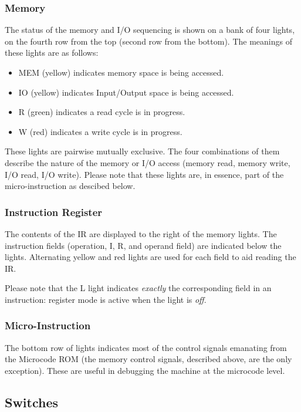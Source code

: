 \documentclass[11pt,a4paper,twocolumns]{article}
\newcommand{\lt}[1]{\textsf{#1}}
\newcommand\register[1]{\textsf{#1}}
\newcommand\IR{\register{IR}}
\begin{document}
\subsubsection{Memory}

The status of the memory and I/O sequencing is shown on a bank of four lights,
on the fourth row from the top (second row from the bottom). The meanings of
these lights are as follows:

\begin{itemize}
\item \lt{MEM} (yellow) indicates memory space is being accessed.
\item \lt{IO} (yellow) indicates Input/Output space is being accessed.
\item \lt{R} (green) indicates a read cycle is in progress.
\item \lt{W} (red) indicates a write cycle is in progress.
\end{itemize}

These lights are pairwise mutually exclusive. The four combinations of them
describe the nature of the memory or I/O access (memory read, memory write, I/O
read, I/O write). Please note that these lights are, in essence, part of the
micro-instruction as descibed below.

\subsubsection{Instruction Register}

The contents of the \IR{} are displayed to the right of the memory lights. The
instruction fields (operation, I, R, and operand field) are indicated below the
lights. Alternating yellow and red lights are used for each field to aid
reading the IR.

Please note that the \lt{L} light indicates {\em exactly\/} the corresponding
field in an instruction: register mode is active when the light is {\em off}.

\subsubsection{Micro-Instruction}

The bottom row of lights indicates most of the control signals emanating from
the Microcode ROM (the memory control signals, described above, are the only
exception). These are useful in debugging the machine at the microcode level.

\subsection{Switches}
\end{document}
